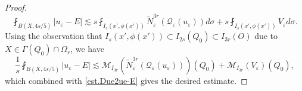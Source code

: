 \documentclass[reqno,12pt]{amsart} %
\newtheorem{lemma}[theorem]{Lemma}
\theoremstyle{definition}
\theoremstyle{remark}
\numberwithin{equation}{section}
\newcommand{\cL}{\mathcal{L}}
\newcommand{\M}{\mathcal{M}}
\newcommand{\Q}{\mathcal{Q}}
\newcommand{\e}{\varepsilon}
\begin{document}
\begin{proof}
\begin{equation}
    \fint_{B(X,4s/5)} |u_\e - E| \lesssim s \fint_{I_s(x',\phi(x'))} \widetilde{N}_\e^{3r}(\Q_\e(u_\e)) d\sigma + s \fint_{I_s(x',\phi(x'))} V_\e d\sigma.
\end{equation}
Using the observation that $I_s(x',\phi(x')) \subset I_{2s}(Q_0) \subset I_{3r}(O)$ due to $X\in \Gamma(Q_0) \cap \Omega_r$, we have
\begin{equation}
    \frac{1}{s}\fint_{B(X,4s/5)} |u_\e - E| \lesssim \M_{I_{3r}} (\widetilde{N}_\e^{3r}(\Q_\e(u_\e)))(Q_0) + \M_{I_{3r}} (V_\e)(Q_0),
\end{equation}
which combined with \eqref{est.Due2ue-E} gives the desired estimate.
\end{proof}


\end{document}
